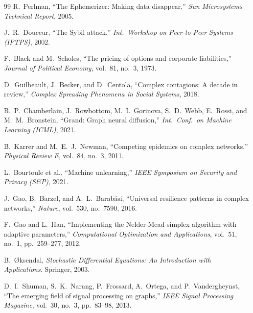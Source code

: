 \documentclass[conference]{IEEEtran}
\begin{document}
\begin{thebibliography}{99}
R.~Perlman,
``The Ephemerizer: Making data disappear,''
\textit{Sun Microsystems Technical Report}, 2005.

J.~R.~Douceur,
``The Sybil attack,''
\textit{Int.\ Workshop on Peer-to-Peer Systems (IPTPS)}, 2002.

F.~Black and M.~Scholes,
``The pricing of options and corporate liabilities,''
\textit{Journal of Political Economy}, vol.~81, no.~3, 1973.

D.~Guilbeault, J.~Becker, and D.~Centola,
``Complex contagions: A decade in review,''
\textit{Complex Spreading Phenomena in Social Systems}, 2018.

B.~P.~Chamberlain, J.~Rowbottom, M.~I.~Gorinova, S.~D.~Webb, E.~Rossi,
and M.~M.~Bronstein,
``Grand: Graph neural diffusion,''
\textit{Int.\ Conf.\ on Machine Learning (ICML)}, 2021.

B.~Karrer and M.~E.~J.~Newman,
``Competing epidemics on complex networks,''
\textit{Physical Review E}, vol.~84, no.~3, 2011.

L.~Bourtoule et al.,
``Machine unlearning,''
\textit{IEEE Symposium on Security and Privacy (S\&P)}, 2021.

J.~Gao, B.~Barzel, and A.~L.~Barab\'{a}si,
``Universal resilience patterns in complex networks,''
\textit{Nature}, vol.~530, no.~7590, 2016.

F.~Gao and L.~Han,
``Implementing the Nelder-Mead simplex algorithm with adaptive parameters,''
\textit{Computational Optimization and Applications},
vol.~51, no.~1, pp.~259--277, 2012.

B.~{\O}ksendal,
\textit{Stochastic Differential Equations: An Introduction with Applications}.
Springer, 2003.

D.~I.~Shuman, S.~K.~Narang, P.~Frossard, A.~Ortega, and P.~Vandergheynst,
``The emerging field of signal processing on graphs,''
\textit{IEEE Signal Processing Magazine}, vol.~30, no.~3, pp.~83--98, 2013.

\end{thebibliography}
\end{document}

